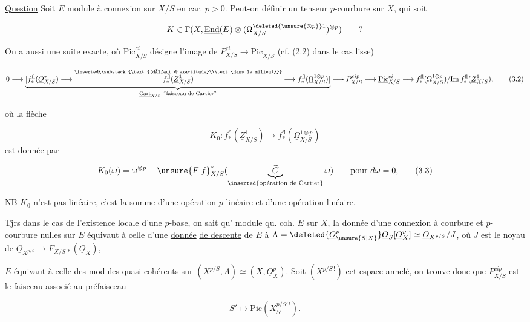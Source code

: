 
\uline{Question} Soit $E$ module à connexion  sur $X/S$ en car. $p>0$. Peut-on définir un tenseur  $p$-courbure sur $X$, qui soit

\[
K\in\Gamma(X,\underline{\mathrm{End}}(E)\otimes(\Omega^{\deleted{\unsure{\otimes p}}1}_{X/S})^{\otimes p})\qquad ?
\]

On a aussi une  suite exacte, où $\underline{\mathrm{Pic}}^{ci}_{X/S}$ désigne l'image de  $P^{ci}_{X/S}\longrightarrow\underline{\mathrm{Pic}}_{X/S}$ (cf. (2.2) dans le cas lisse)

\[
0\longrightarrow
\underbrace{[f_*^{\mathrm{fl}}(\underline O^*_{X/S})\longrightarrow \overset{\inserted{\substack{\text{(défaut d'exactitude}\\\text{dans le milieu)}}}}{f_*^{\mathrm{fl}}(\underline Z^1_{X/S})}\longrightarrow f_*^{\mathrm{fl}}(\underline\Omega^{1\otimes p}_{X/S})]}_{\underline{\mathrm{Cart}}_{X/S}\ \text{``faisceau de Cartier''}}
\longrightarrow P^{cip}_{X/S}\longrightarrow\underline{\mathrm{Pic}}^{ci}_{X/S}
\longrightarrow f_*^{\mathrm{fl}}(\Omega^{1\otimes p}_{X/S})/\mathrm{Im}\,f_*^{\mathrm{fl}}(\underline Z^1_{X/S}),
\tag*{(3.2)}
\]

où la flèche

\[
K_0\colon f_*^{\mathrm{fl}}(\underline Z^1_{X/S})\longrightarrow f_*^{\mathrm{fl}}(\underline\Omega^{1\otimes p}_{X/S})
\]
est donnée par

\[
K_0(\omega)=\omega^{\otimes p}-{\unsure{F|f}}_{X/S}^*(\underbrace{\widetilde C}_{\text{\inserted{opération de Cartier}}}\omega)\qquad\text{pour $d\omega=0$,}\tag*{(3.3)}
\]

\uline{NB} $K_0$  n'est pas linéaire, c'est la somme d'une opération $p$-linéaire et d'une opération linéaire.

Tjrs dans le cas de l'existence locale d'une $p$-base, on sait qu' module  qu. coh. $E$ sur $X$, la donnée d'une connexion à courbure et $p$-courbure nulles  sur $E$ équivaut à celle d'une \uline{donnée} \uline{de descente} de $E$ à $\Lambda=\deleted{\underline O_{\unsure{S|X}}^p}\underline O_S[\underline O_X^p]\simeq\underline O_{X^{p/S}}/J$, où $J$ est le noyau de $\underline O_{X^{p/S}}\longrightarrow F_{X/S\,*}(\underline O_X)$,

  $E$ équivaut à celle des modules quasi-cohérents sur $(X^{p/S},\Lambda)\simeq(X,\underline O_X^p)$. Soit $(X^{p/S\,!})$ cet espace annelé, on trouve donc que $P^{cip}_{X/S}$ est le faisceau associé au préfaisceau

\[
S'\longmapsto\mathrm{Pic}(X_{S'}^{p/S'\,!}).
\]

